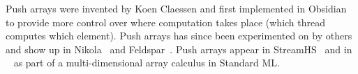 \documentclass[a4paper]{book}
\newcommand{\paperA}{Paper A}
\newcommand{\paperATitle}{Simple and Compositional Reification of Monadic Embedded Languages}
\begin{document}
Push arrays were invented by Koen Claessen and first implemented in Obsidian 
to provide more control over where computation takes place (which thread computes 
which element). Push arrays has since been experimented on by others and show up 
in Nikola~\citet{NIKOLAPUSH} and Feldspar~\citet{FELDSPARPUSH}. Push arrays appear 
in StreamHS~\citet{FPCDSL} and in ~\citet{MOA} as part of a multi-dimensional array 
calculus in Standard ML. 


%
%






\end{document}
